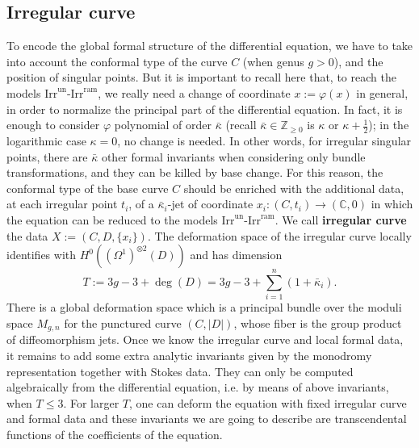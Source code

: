 \documentclass[12]{amsart}
\newcommand{\Irrun}{\boldsymbol{\mathrm{Irr}^{\mathrm{un}}}}
\newcommand{\Irram}{\boldsymbol{\mathrm{Irr}^{\mathrm{ram}}}}
\begin{document}
\subsection{Irregular curve}\label{sec:IrregCurve}
To encode the global formal structure of the differential equation, we have to take
into account the conformal type of the curve $C$ (when genus $g>0$), and the position
of singular points. 
But it is important to recall here that, to reach the models $\Irrun$-$\Irram$,
we really need a change of coordinate $x:=\varphi(x)$ in general, in order to normalize the principal part 
of the differential equation. In fact, it is enough to consider 
$\varphi$ polynomial of order $\bar\kappa$ (recall $\bar\kappa\in\mathbb Z_{\ge0}$ is $\kappa$ or $\kappa+\frac{1}{2}$);
in the logarithmic case $\kappa=0$, no change is needed. In other words, for irregular singular points,
there are $\bar\kappa$ other formal invariants when considering only bundle transformations, 
and they can be killed by base change. For this reason, the conformal type of the base curve $C$ should
be enriched with the additional data, at each irregular point $t_i$, of a $\bar\kappa_i$-jet of coordinate 
$x_i:(C,t_i)\to(\mathbb C,0)$ in which the 
equation can be reduced to the models $\Irrun$-$\Irram$. We call {\bf irregular curve}
the data $X:=(C,D,\{x_i\})$. The deformation space of the irregular curve locally identifies with $H^0((\Omega^1)^{\otimes 2}(D))$
and has dimension 
\begin{equation}\label{eq:dimirrTeich}
T:=3g-3+\deg(D)=3g-3+\sum_{i=1}^n(1+\bar\kappa_i).
\end{equation}
There is a global deformation space which is a principal bundle over the moduli space $M_{g,n}$ 
for the punctured curve $(C,\vert D\vert)$, whose fiber is the group product of diffeomorphism jets.
Once we know the irregular curve and local formal data, it remains to add some extra analytic invariants
given by the monodromy representation together with Stokes data.
They can only be computed algebraically from the differential equation, i.e. by means of above invariants, 
when $T\le3$. For larger $T$, one can deform the equation with fixed irregular curve and formal data 
and these invariants we are going to describe are transcendental functions of the coefficients of the equation.
\end{document}
